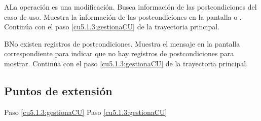  \begin{UCtrayectoriaA}{A}{La operación es una modificación.}
    \UCpaso[\UCsist] Busca información de las postcondiciones del caso de uso. 
    \UCpaso[\UCsist] Muestra la información de las postcondiciones en la pantalla  o . 
    \UCpaso[] Continúa con el paso \ref{cu5.1.3:gestionaCU} de la trayectoria principal.
 \end{UCtrayectoriaA}
 
 \begin{UCtrayectoriaA}{B}{No existen registros de postcondiciones.}
    \UCpaso[\UCsist] Muestra el mensaje  en la pantalla correspondiente
    para indicar que no hay registros de postcondiciones para mostrar.
    \UCpaso[] Continúa con el paso \ref{cu5.1.3:gestionaCU} de la trayectoria principal.
 \end{UCtrayectoriaA}

 

\subsection{Puntos de extensión}

	{Paso \ref{cu5.1.3:gestionaCU}}
	{}
	{Paso \ref{cu5.1.3:gestionaCU}}
	{}
  